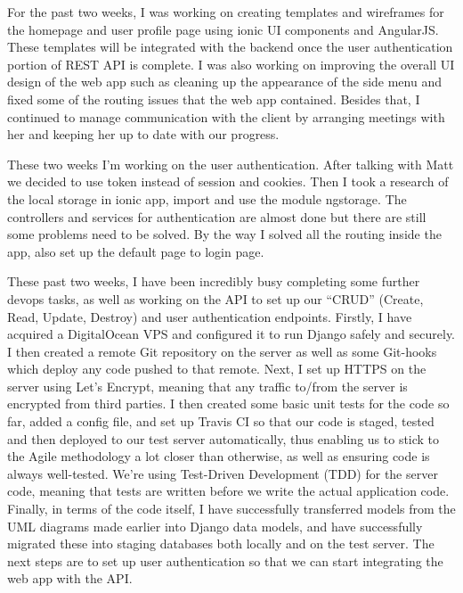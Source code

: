 \documentclass[11pt]{report}
\begin{document}
\bigskip
{}
\smallskip

\noindent
For the past two weeks, I was working on creating templates and wireframes for
the homepage and user profile page using ionic UI components and AngularJS\@.
These templates will be integrated with the backend once the user authentication
portion of REST API is complete. I was also working on improving the overall UI
design of the web app such as cleaning up the appearance of the side menu and
fixed some of the routing issues that the web app contained. Besides that, I
continued to manage communication with the client by arranging meetings with her
and keeping her up to date with our progress.

\bigskip
{}
\smallskip

\noindent
These two weeks I'm working on the user authentication. After talking with Matt
we decided to use token instead of session and cookies. Then I took a research
of the local storage in ionic app, import and use the module ngstorage. The
controllers and services for authentication are almost done but there are still
some problems need to be solved. By the way I solved all the routing inside the
app, also set up the default page to login page.

\bigskip
{}
\smallskip

\noindent
These past two weeks, I have been incredibly busy completing some further devops
tasks, as well as working on the API to set up our ``CRUD'' (Create, Read, Update,
Destroy) and user authentication endpoints. Firstly, I have acquired a
DigitalOcean VPS and configured it to run Django safely and securely. I then
created a remote Git repository on the server as well as some Git-hooks which
deploy any code pushed to that remote. Next, I set up HTTPS on the server using
Let’s Encrypt, meaning that any traffic to/from the server is encrypted from
third parties. I then created some basic unit tests for the code so far, added a
config file, and set up Travis CI so that our code is staged, tested and then
deployed to our test server automatically, thus enabling us to stick to the
Agile methodology a lot closer than otherwise, as well as ensuring code is
always well-tested. We’re using Test-Driven Development (TDD) for the server
code, meaning that tests are written before we write the actual application
code. Finally, in terms of the code itself, I have successfully transferred
models from the UML diagrams made earlier into Django data models, and have
successfully migrated these into staging databases both locally and on the test
server. The next steps are to set up user authentication so that we can start
integrating the web app with the API\@.
\end{document}
